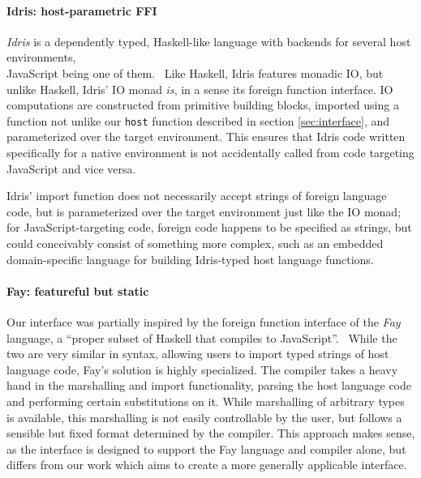 \documentclass[preprint]{sigplanconf}
\begin{document}
\paragraph{Idris: host-parametric FFI}
\emph{Idris} is a dependently typed, Haskell-like language with backends for
several host environments,\\
JavaScript being one of them.\ \cite{idris}
Like Haskell, Idris features monadic IO, but unlike Haskell, Idris' IO monad
\emph{is}, in a sense its foreign function interface.
IO computations are constructed from primitive building blocks, imported using
a function not unlike our \lstinline!host! function described in section
\ref{sec:interface}, and parameterized over the target environment.
This ensures that Idris code written specifically for a native environment
is not accidentally called from code targeting JavaScript and vice versa.

Idris' import function does not necessarily accept strings of foreign
language code, but is parameterized over the target environment just like the
IO monad; for JavaScript-targeting code, foreign code happens to be specified
as strings, but could conceivably consist of something more complex, such as
an embedded domain-specific language for building Idris-typed host language
functions.

\paragraph{Fay: featureful but static}
Our interface was partially inspired by the foreign function interface of the
\emph{Fay} language,
a ``proper subset of Haskell that compiles to JavaScript''.\ \cite{fay}
While the two are very similar in syntax, allowing users to import typed
strings of host language code, Fay's solution is highly specialized.
The compiler takes a heavy hand in the marshalling and import functionality,
parsing the host language code and performing certain substitutions on it.
While marshalling of arbitrary types is available, this marshalling is not
easily controllable by the user, but follows a sensible but fixed format
determined by the compiler.
This approach makes sense, as the interface is designed to support the Fay
language and compiler alone, but differs from our work which aims to create
a more generally applicable interface.
\end{document}
